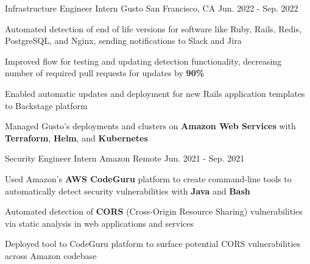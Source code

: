 \begin{cventries}
\cventry
{Infrastructure Engineer Intern} %
{Gusto} %
{San Francisco, CA} %
{Jun. 2022 - Sep. 2022} %
{
  \begin{cvitems} %
    \item {Automated detection of end of life versions for software like Ruby, Rails, Redis, PostgreSQL, and Nginx, sending notifications to Slack and Jira}
    \item {Improved flow for testing and updating detection functionality, decreasing number of required pull requests for updates by \textbf{90\%}}
    \item {Enabled automatic updates and deployment for new Rails application templates to Backstage platform}
    \item {Managed Gusto's deployments and clusters on \textbf{Amazon Web Services} with \textbf{Terraform}, \textbf{Helm}, and \textbf{Kubernetes}}
  \end{cvitems}
}

\cventry
  {Security Engineer Intern} %
  {Amazon} %
  {Remote} %
  {Jun. 2021 - Sep. 2021} %
  {
    \begin{cvitems} %
      \item {Used Amazon's \textbf{AWS CodeGuru} platform to create command-line tools to automatically detect security vulnerabilities with \textbf{Java} and \textbf{Bash}}
      \item {Automated detection of \textbf{CORS} (Cross-Origin Resource Sharing) vulnerabilities via static analysis in web applications and services}
      \item {Deployed tool to CodeGuru platform to surface potential CORS vulnerabilities across Amazon codebase}
    \end{cvitems}
  }



\end{cventries}
